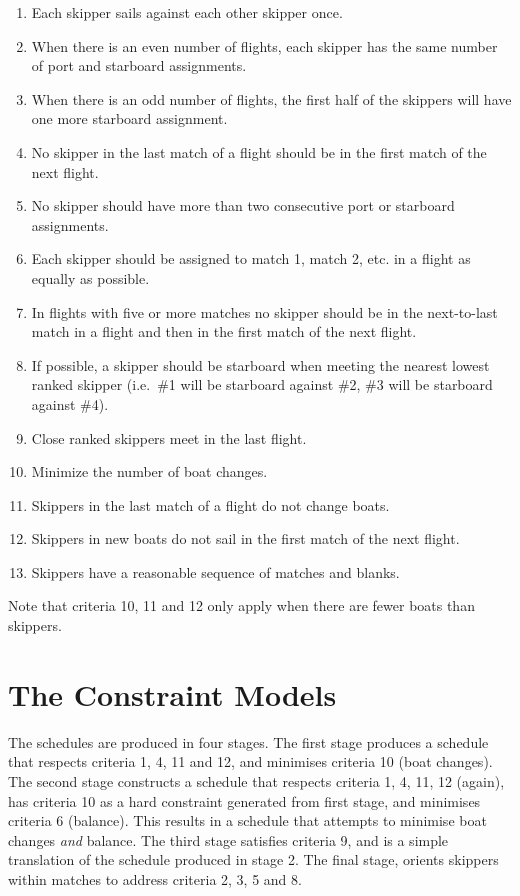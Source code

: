 \documentclass{llncs}
\begin{document}
\begin{enumerate}
\item Each skipper sails against each other skipper once.
\item When there is an even number of flights, each skipper has the same number
    of port and starboard assignments.
\item When there is an odd number of flights, the first half of the skippers
    will have one more starboard assignment.
\item No skipper in the last match of a flight should be in the first match of
    the next flight.
\item No skipper should have more than two consecutive port or starboard
    assignments.
\item Each skipper should be assigned to match 1, match 2, etc. in a flight as
    equally as possible.
\item In flights with five or more matches no skipper should be in the
    next-to-last match in a flight and then in the first match of the next
    flight.
\item If possible, a skipper should be starboard when meeting the nearest
    lowest ranked skipper (i.e.\ \#1 will be starboard against \#2, \#3 will be
    starboard against \#4).
\item Close ranked skippers meet in the last flight.
\item Minimize the number of boat changes.
\item Skippers in the last match of a flight do not change boats.
\item Skippers in new boats do not sail in the first match of the next flight.
\item Skippers have a reasonable sequence of matches and blanks.
\end{enumerate}

Note that criteria 10, 11 and 12 only apply when there are fewer boats than
skippers.

\section{The Constraint Models}

The schedules are produced in four stages. The first stage produces a schedule
that respects criteria 1, 4, 11 and 12, and minimises criteria 10 (boat
changes). The second stage constructs a schedule that respects criteria 1, 4,
11, 12 (again), has criteria 10 as a hard constraint generated from first
stage, and minimises criteria 6 (balance). This results in a schedule that
attempts to minimise boat changes \emph{and} balance. The third stage satisfies
criteria 9, and is a simple translation of the schedule produced in stage 2.
The final stage, orients skippers within matches to address criteria 2, 3, 5
and 8.
\end{document}
